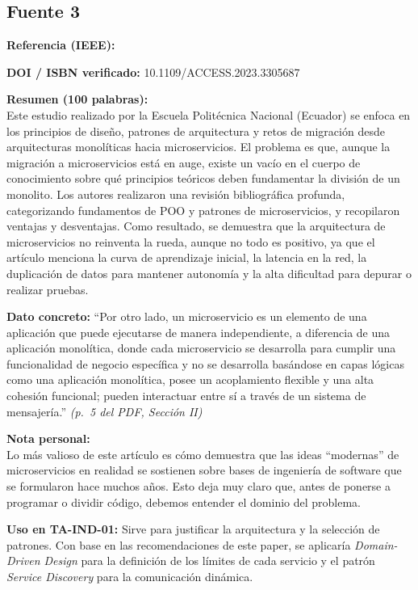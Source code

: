 \documentclass[11pt,a4paper]{article}
\newcommand{\ficha}[7]{%
  \begin{tcolorbox}[colback=white,colframe=black!60,
    title={Ficha bibliográfica},breakable]
    \textbf{Referencia (IEEE):}\\
    \fullcite{#1}

    \medskip
    \textbf{DOI / ISBN verificado:} #2

    \medskip
    \textbf{Resumen (100 palabras):}\\
    #3

    \medskip
    \textbf{Dato concreto:} #4 \textit{(#5)}

    \medskip
    \textbf{Nota personal:}\\
    #6

    \medskip
    \textbf{Uso en TA-IND-01:} #7
  \end{tcolorbox}
  \vspace{1em}
}
\begin{document}
\subsection{Fuente 3}
\ficha{fuente3}{10.1109/ACCESS.2023.3305687}{Este estudio realizado por la Escuela Politécnica Nacional (Ecuador) se enfoca en los principios de diseño, patrones de arquitectura y retos de migración desde arquitecturas monolíticas hacia microservicios. El problema es que, aunque la migración a microservicios está en auge, existe un vacío en el cuerpo de conocimiento sobre qué principios teóricos deben fundamentar la división de un monolito. Los autores realizaron una revisión bibliográfica profunda, categorizando fundamentos de POO y patrones de microservicios, y recopilaron ventajas y desventajas. Como resultado, se demuestra que la arquitectura de microservicios no reinventa la rueda, aunque no todo es positivo, ya que el artículo menciona la curva de aprendizaje inicial, la latencia en la red, la duplicación de datos para mantener autonomía y la alta dificultad para depurar o realizar pruebas.}{\enquote{Por otro lado, un microservicio es un elemento de una aplicación que puede ejecutarse de manera independiente, a diferencia de una aplicación monolítica, donde cada microservicio se desarrolla para cumplir una funcionalidad de negocio específica y no se desarrolla basándose en capas lógicas como una aplicación monolítica, posee un acoplamiento flexible y una alta cohesión funcional; pueden interactuar entre sí a través de un sistema de mensajería.}}{p.~5 del PDF, Sección II}{Lo más valioso de este artículo es cómo demuestra que las ideas \enquote{modernas} de microservicios en realidad se sostienen sobre bases de ingeniería de software que se formularon hace muchos años. Esto deja muy claro que, antes de ponerse a programar o dividir código, debemos entender el dominio del problema.}{Sirve para justificar la arquitectura y la selección de patrones. Con base en las recomendaciones de este paper, se aplicaría \textit{Domain-Driven Design} para la definición de los límites de cada servicio y el patrón \textit{Service Discovery} para la comunicación dinámica.}
\end{document}
